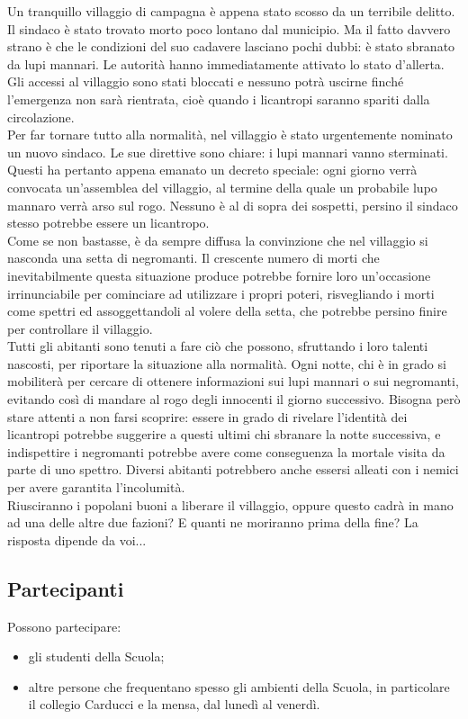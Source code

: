 \documentclass[a4paper,10pt]{article}
\begin{document}
Un tranquillo villaggio di campagna è appena stato scosso da un terribile delitto. Il sindaco è stato trovato morto poco lontano dal municipio. Ma il fatto davvero strano è che le condizioni del suo cadavere lasciano pochi dubbi: è stato sbranato da lupi mannari. Le autorità hanno immediatamente attivato lo stato d'allerta. Gli accessi al villaggio sono stati bloccati e nessuno potrà uscirne finché l'emergenza non sarà rientrata, cioè quando i licantropi saranno spariti dalla circolazione.\\
Per far tornare tutto alla normalità, nel villaggio è stato urgentemente nominato un nuovo sindaco. Le sue direttive sono chiare: i lupi mannari vanno sterminati. Questi ha pertanto appena emanato un decreto speciale: ogni giorno verrà convocata un'assemblea del villaggio, al termine della quale un probabile lupo mannaro verrà arso sul rogo. Nessuno è al di sopra dei sospetti, persino il sindaco stesso potrebbe essere un licantropo.\\
Come se non bastasse, è da sempre diffusa la convinzione che nel villaggio si nasconda una setta di negromanti. Il crescente numero di morti che inevitabilmente questa situazione produce potrebbe fornire loro un'occasione irrinunciabile per cominciare ad utilizzare i propri poteri, risvegliando i morti come spettri ed assoggettandoli al volere della setta, che potrebbe persino finire per controllare il villaggio.\\
Tutti gli abitanti sono tenuti a fare ciò che possono, sfruttando i loro talenti nascosti, per riportare la situazione alla normalità. Ogni notte, chi è in grado si mobiliterà per cercare di ottenere informazioni sui lupi mannari o sui negromanti, evitando così di mandare al rogo degli innocenti il giorno successivo. Bisogna però stare attenti a non farsi scoprire: essere in grado di rivelare l'identità dei licantropi potrebbe suggerire a questi ultimi chi sbranare la notte successiva, e indispettire i negromanti potrebbe avere come conseguenza la mortale visita da parte di uno spettro. Diversi abitanti potrebbero anche essersi alleati con i nemici per avere garantita l'incolumità.\\
Riusciranno i popolani buoni a liberare il villaggio, oppure questo cadrà in mano ad una delle altre due fazioni? E quanti ne moriranno prima della fine? La risposta dipende da voi...


\subsection{Partecipanti}
Possono partecipare:
\begin{itemize}
 \item gli studenti della Scuola;
 \item altre persone che frequentano spesso gli ambienti della Scuola, in particolare il collegio Carducci e la mensa, dal lunedì al venerdì.
\end{itemize}
\end{document}
